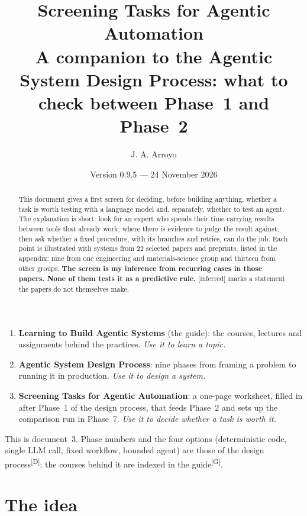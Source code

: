 \documentclass[10pt]{article}
\title{\textbf{Screening Tasks for Agentic Automation}\\[4pt]
\large A companion to the Agentic System Design Process: what to check between Phase~1 and Phase~2}
\author{J. A. Arroyo}
\date{Version 0.9.5 --- 24 November 2026}
\newcommand{\inferred}{\textsf{\small[inferred]}}
\newcommand{\p}[1]{\textsuperscript{[#1]}}
\begin{document}
\maketitle

\begin{abstract}
\noindent This document gives a first screen for deciding, before building anything, whether a task is worth testing with a language model and, separately, whether to test an agent.
The explanation is short: look for an expert who spends their time carrying results between tools that already work, where there is evidence to judge the result against; then ask whether a fixed procedure, with its branches and retries, can do the job.
Each point is illustrated with systems from 22 selected papers and preprints, listed in the appendix: nine from one engineering and materials-science group and thirteen from other groups.
\textbf{The screen is my inference from recurring cases in those papers. None of them tests it as a predictive rule.}
\inferred{} marks a statement the papers do not themselves make.
\end{abstract}

\begin{tcolorbox}[colback=black!3,colframe=black!35,boxrule=0.4pt,arc=1pt,left=4pt,right=4pt,top=2pt,bottom=2pt,title={One set of three documents},fonttitle=\sffamily\bfseries\small]
\small
\begin{enumerate}[leftmargin=1.4em,itemsep=0pt]
\item \textbf{Learning to Build Agentic Systems} (the guide): the courses, lectures and assignments behind the practices. \emph{Use it to learn a topic.}
\item \textbf{Agentic System Design Process}: nine phases from framing a problem to running it in production. \emph{Use it to design a system.}
\item \textbf{Screening Tasks for Agentic Automation}: a one-page worksheet, filled in after Phase~1 of the design process, that feeds Phase~2 and sets up the comparison run in Phase~7. \emph{Use it to decide whether a task is worth it.}
\end{enumerate}
This is document~3. Phase numbers and the four options (deterministic code, single LLM call, fixed workflow, bounded agent) are those of the design process\p{D}; the courses behind it are indexed in the guide\p{G}.
\end{tcolorbox}

\section{The idea}
\end{document}
